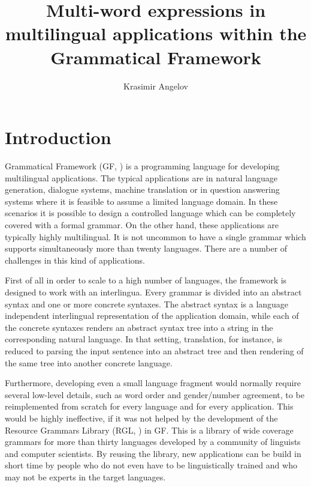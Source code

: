 \documentclass[output=paper]{LSP/langsci}
\author{Krasimir Angelov \affiliation{University of Gothenburg}
}
\title{Multi-word expressions in multilingual applications within
the Grammatical Framework}
\begin{document}
\section{Introduction}

Grammatical Framework (GF, \citealt{ranta-2011}) is a programming language 
for developing multilingual applications. The typical applications are in
natural language generation, dialogue systems, machine translation
or in question answering systems where it is feasible to assume 
a limited language domain. In these scenarios it is possible to design
a controlled language which can be completely covered with
a formal grammar. On the other hand, these applications are typically
highly multilingual. It is not uncommon to have a single grammar
which supports simultaneously more than twenty languages.
There are a number of challenges in this kind of applications.

First of all in order to scale to a high number of languages,
the framework is designed to work with an interlingua. Every grammar
is divided into an abstract syntax and one or more concrete syntaxes.
The abstract syntax is a language independent interlingual representation
of the application domain, while each of the concrete syntaxes
renders an abstract syntax tree into a string in 
the corresponding natural language. In that setting, translation, for instance,
is reduced to parsing the input sentence into an abstract
tree and then rendering of the same tree into another concrete language.

Furthermore, developing even a small language fragment would normally
require several low-level details, such as word order and gender/number
agreement, to be reimplemented from scratch for every language
and for every application. This would be highly ineffective, if
it was not helped by the development of the Resource Grammars Library (RGL, \citealt{gf-rgl}) in GF.
This is a library of wide coverage grammars for more than thirty 
languages developed by a community of linguists and computer scientists.
By reusing the library, new applications can be build in short time
by people who do not even have to be linguistically trained and who
may not be experts in the target languages.
\end{document}
